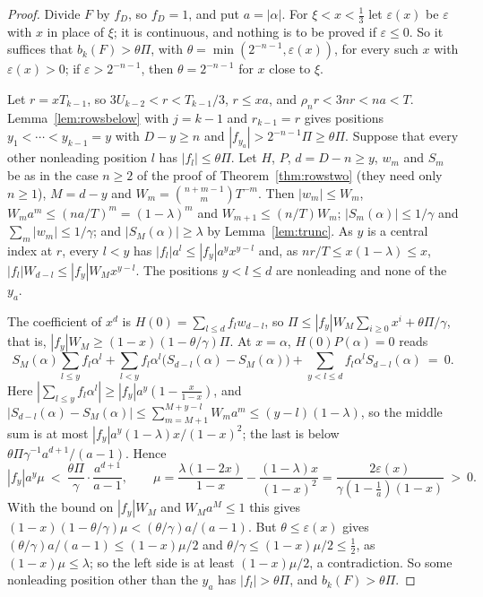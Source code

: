 \documentclass[11pt]{article}
\begin{document}
\begin{proof}
Divide $F$ by $f_D$, so $f_D=1$, and put $a=|\alpha|$.  For $\xi<x<\frac13$
let $\varepsilon(x)$ be $\varepsilon$ with $x$ in place of $\xi$; it is
continuous, and nothing is to be proved if $\varepsilon\le0$.  So it suffices
that $b_k(F)>\theta\Pi$, with $\theta=\min(2^{-n-1},\varepsilon(x))$, for
every such $x$ with $\varepsilon(x)>0$; if $\varepsilon>2^{-n-1}$, then
$\theta=2^{-n-1}$ for $x$ close to $\xi$.

Let $r=xT_{k-1}$, so $3U_{k-2}<r<T_{k-1}/3$, $r\le xa$, and $\rho_nr<3nr<na<T$.
Lemma~\ref{lem:rowsbelow} with $j=k-1$ and $r_{k-1}=r$ gives positions
$y_1<\cdots<y_{k-1}=y$ with $D-y\ge n$ and $|f_{y_a}|>2^{-n-1}\Pi\ge\theta\Pi$.
Suppose that every other nonleading position $l$ has $|f_l|\le\theta\Pi$.
Let $H$, $P$, $d=D-n\ge y$, $w_m$ and $S_m$ be as in the case $n\ge2$ of the
proof of Theorem~\ref{thm:rowstwo} (they need only $n\ge1$), $M=d-y$ and $W_m=\binom{n+m-1}mT^{-m}$.  Then
$|w_m|\le W_m$, $W_ma^m\le(na/T)^m=(1-\lambda)^m$ and $W_{m+1}\le(n/T)W_m$;
$|S_m(\alpha)|\le1/\gamma$ and $\sum_m|w_m|\le1/\gamma$; and
$|S_M(\alpha)|\ge\lambda$ by Lemma~\ref{lem:trunc}.  As $y$ is a central
index at $r$, every $l<y$ has $|f_l|a^l\le|f_y|a^yx^{y-l}$ and, as
$nr/T\le x(1-\lambda)\le x$, $|f_l|W_{d-l}\le|f_y|W_Mx^{y-l}$.  The positions
$y<l\le d$ are nonleading and none of the $y_a$.

The coefficient of $x^d$ is $H(0)=\sum_{l\le d}f_lw_{d-l}$, so
$\Pi\le|f_y|W_M\sum_{i\ge0}x^i+\theta\Pi/\gamma$, that is,
$|f_y|W_M\ge(1-x)(1-\theta/\gamma)\Pi$.  At $x=\alpha$, $H(0)P(\alpha)=0$
reads
\[
  S_M(\alpha)\sum_{l\le y}f_l\alpha^l+\sum_{l<y}f_l\alpha^l\bigl(S_{d-l}(\alpha)-S_M(\alpha)\bigr)
  +\sum_{y<l\le d}f_l\alpha^lS_{d-l}(\alpha)\ =\ 0 .
\]
Here $|\sum_{l\le y}f_l\alpha^l|\ge|f_y|a^y(1-\frac x{1-x})$, and
$|S_{d-l}(\alpha)-S_M(\alpha)|\le\sum_{m=M+1}^{M+y-l}W_ma^m\le(y-l)(1-\lambda)$,
so the middle sum is at most $|f_y|a^y(1-\lambda)x/(1-x)^2$; the last is
below $\theta\Pi\gamma^{-1}a^{d+1}/(a-1)$.  Hence
\[
  |f_y|a^y\mu\ <\ \frac{\theta\Pi}\gamma\cdot\frac{a^{d+1}}{a-1},\qquad
  \mu=\frac{\lambda(1-2x)}{1-x}-\frac{(1-\lambda)x}{(1-x)^2}
  =\frac{2\varepsilon(x)}{\gamma(1-\frac1a)(1-x)}\ >\ 0 .
\]
With the bound on $|f_y|W_M$ and $W_Ma^M\le1$ this gives
$(1-x)(1-\theta/\gamma)\mu<(\theta/\gamma)a/(a-1)$.  But $\theta\le\varepsilon(x)$
gives $(\theta/\gamma)a/(a-1)\le(1-x)\mu/2$ and $\theta/\gamma\le(1-x)\mu/2\le\frac12$,
as $(1-x)\mu\le\lambda$; so the left side is at least $(1-x)\mu/2$, a
contradiction.  So some nonleading position other than the $y_a$ has
$|f_l|>\theta\Pi$, and $b_k(F)>\theta\Pi$.
\end{proof}
\end{document}
